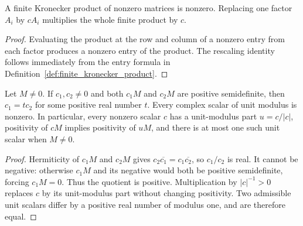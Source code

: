 \begin{lemma}%
    \label{lem:finite_kronecker_elementary}
    \leanok
    A finite Kronecker product of nonzero matrices is nonzero. Replacing one
    factor $A_i$ by $cA_i$ multiplies the whole finite product by $c$.
\end{lemma}

\begin{proof}
    \leanok
    Evaluating the product at the row and column of a nonzero entry from each
    factor produces a nonzero entry of the product. The rescaling identity
    follows immediately from the entry formula in
    Definition~\ref{def:finite_kronecker_product}.
\end{proof}

\begin{lemma}%
    \label{thm:positive_rescaling_phase_unique}
    \leanok
    Let $M\ne0$. If $c_1,c_2\ne0$ and both $c_1M$ and $c_2M$ are positive
    semidefinite, then $c_1=t c_2$ for some positive real number $t$.
    Every complex scalar of unit modulus is nonzero. In particular, every
    nonzero scalar $c$ has a unit-modulus part $u=c/|c|$, positivity of $cM$
    implies positivity of $uM$, and there is at most one such unit scalar when
    $M\ne0$.
\end{lemma}

\begin{proof}
    \leanok
    Hermiticity of $c_1M$ and $c_2M$ gives
    $c_2\overline{c_1}=c_1\overline{c_2}$, so $c_1/c_2$ is real. It cannot be
    negative: otherwise $c_1M$ and its negative would both be positive
    semidefinite, forcing $c_1M=0$. Thus the quotient is positive.
    Multiplication by $|c|^{-1}>0$ replaces $c$ by its unit-modulus part
    without changing positivity. Two admissible unit scalars differ by a
    positive real number of modulus one, and are therefore equal.
\end{proof}

